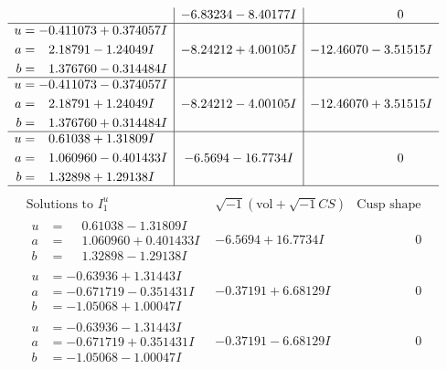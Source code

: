 \documentclass[1p]{elsarticle_modified}
\theoremstyle{definition}
\newcommand{\I}{\sqrt{-1}}
\begin{document}
$$\begin{array}{c|c|c}
 & -6.83234 - 8.40177 I & \phantom{-0.000000 } 0 \\ \hline\begin{aligned}
u &= -0.411073 + 0.374057 I \\
a &= \phantom{-}2.18791 - 1.24049 I \\
b &= \phantom{-}1.376760 - 0.314484 I\end{aligned}
 & -8.24212 + 4.00105 I & -12.46070 - 3.51515 I \\ \hline\begin{aligned}
u &= -0.411073 - 0.374057 I \\
a &= \phantom{-}2.18791 + 1.24049 I \\
b &= \phantom{-}1.376760 + 0.314484 I\end{aligned}
 & -8.24212 - 4.00105 I & -12.46070 + 3.51515 I \\ \hline\begin{aligned}
u &= \phantom{-}0.61038 + 1.31809 I \\
a &= \phantom{-}1.060960 - 0.401433 I \\
b &= \phantom{-}1.32898 + 1.29138 I\end{aligned}
 & -6.5694 - 16.7734 I & \phantom{-0.000000 } 0\\
 \hline 
 \end{array}$$\newpage$$\begin{array}{c|c|c}  
\text{Solutions to }I^u_{1}& \I (\text{vol} + \sqrt{-1}CS) & \text{Cusp shape}\\
 \hline 
\begin{aligned}
u &= \phantom{-}0.61038 - 1.31809 I \\
a &= \phantom{-}1.060960 + 0.401433 I \\
b &= \phantom{-}1.32898 - 1.29138 I\end{aligned}
 & -6.5694 + 16.7734 I & \phantom{-0.000000 } 0 \\ \hline\begin{aligned}
u &= -0.63936 + 1.31443 I \\
a &= -0.671719 - 0.351431 I \\
b &= -1.05068 + 1.00047 I\end{aligned}
 & -0.37191 + 6.68129 I & \phantom{-0.000000 } 0 \\ \hline\begin{aligned}
u &= -0.63936 - 1.31443 I \\
a &= -0.671719 + 0.351431 I \\
b &= -1.05068 - 1.00047 I\end{aligned}
 & -0.37191 - 6.68129 I & \phantom{-0.000000 } 0 \\ \hline\begin{aligned}

\end{aligned}
\end{array}$$
\end{document}
